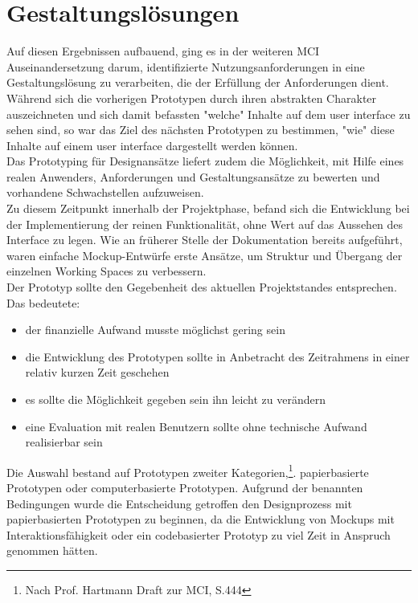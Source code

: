 
\section{Gestaltungslösungen}
Auf diesen Ergebnissen aufbauend, ging es in der weiteren MCI Auseinandersetzung darum, identifizierte Nutzungsanforderungen in eine Gestaltungslösung zu verarbeiten, die der Erfüllung der Anforderungen dient.
Während sich die vorherigen Prototypen durch ihren abstrakten Charakter auszeichneten und sich damit befassten "welche" Inhalte auf dem user interface zu sehen sind, so war das Ziel des nächsten Prototypen zu bestimmen, "wie" diese Inhalte auf einem user interface dargestellt werden können.\\
Das Prototyping für Designansätze liefert zudem die Möglichkeit, mit Hilfe eines realen Anwenders, Anforderungen und Gestaltungsansätze zu bewerten und vorhandene Schwachstellen aufzuweisen.\\
Zu diesem Zeitpunkt innerhalb der Projektphase, befand sich die Entwicklung bei der Implementierung der reinen Funktionalität, ohne Wert auf das Aussehen des Interface zu legen. Wie an früherer Stelle der Dokumentation bereits aufgeführt, waren einfache Mockup-Entwürfe erste Ansätze, um Struktur und Übergang der einzelnen Working Spaces zu verbessern.\\

Der Prototyp sollte den Gegebenheit des aktuellen Projektstandes entsprechen.\\ Das bedeutete:
\begin{itemize}
   \item 
 	der finanzielle Aufwand musste möglichst gering sein

   \item 
   die Entwicklung des Prototypen sollte in Anbetracht des Zeitrahmens in einer relativ kurzen Zeit geschehen

   \item 
   es sollte die Möglichkeit gegeben sein ihn leicht zu verändern

   \item
   eine Evaluation mit realen Benutzern sollte ohne technische Aufwand realisierbar sein
  
\end{itemize} 

Die Auswahl bestand auf Prototypen zweiter Kategorien,\footnote{Nach Prof. Hartmann Draft zur MCI, S.444}. papierbasierte Prototypen oder computerbasierte Prototypen. Aufgrund der benannten Bedingungen wurde die Entscheidung getroffen den Designprozess mit papierbasierten Prototypen zu beginnen, da die Entwicklung von Mockups mit Interaktionsfähigkeit oder ein codebasierter Prototyp zu viel Zeit in Anspruch genommen hätten.

